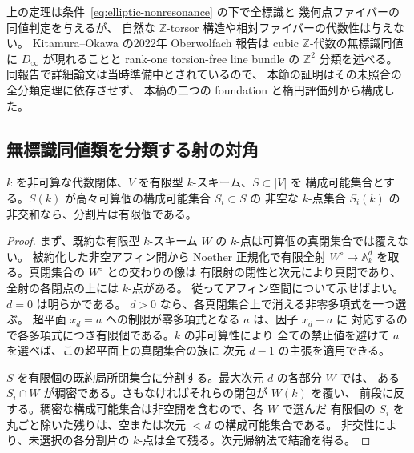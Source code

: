 \begin{remark}[既存研究と残る問題]
上の定理は条件~\eqref{eq:elliptic-nonresonance} の下で全標識と
幾何点ファイバーの同値判定を与えるが、
自然な $\mathbb Z$-torsor 構造や相対ファイバーの代数性は与えない。
Kitamura--Okawa の2022年 Oberwolfach 報告\cite{OkawaKitamura2022OWR}は
cubic $\mathbb Z$-代数の無標識同値に $D_\infty$ が現れることと
rank-one torsion-free line bundle の $\mathbb Z^2$ 分類を述べる。
同報告で詳細論文は当時準備中とされているので、
本節の証明はその未照合の全分類定理に依存させず、
本稿の二つの foundation と楕円評価列から構成した。
\end{remark}

\subsection{無標識同値類を分類する射の対角}
\label{subsec:unmarked-diagonal}

\begin{lemma}[構成可能集合の可算分割]\label{lem:constructible-countable-partition}
$k$ を非可算な代数閉体、$V$ を有限型 $k$-スキーム、$S\subset |V|$ を
構成可能集合とする。$S(k)$ が高々可算個の構成可能集合 $S_i\subset S$ の
非空な $k$-点集合 $S_i(k)$ の非交和なら、分割片は有限個である。
\end{lemma}
\begin{proof}
まず、既約な有限型 $k$-スキーム $W$ の $k$-点は可算個の真閉集合では覆えない。
被約化した非空アフィン開から Noether 正規化で有限全射
$W^\circ\to\mathbb A^d_k$ を取る。真閉集合の $W^\circ$ との交わりの像は
有限射の閉性と次元により真閉であり、全射の各閉点の上には $k$-点がある。
従ってアフィン空間について示せばよい。$d=0$ は明らかである。
$d>0$ なら、各真閉集合上で消える非零多項式を一つ選ぶ。
超平面 $x_d=a$ への制限が零多項式となる $a$ は、因子 $x_d-a$ に
対応するので各多項式につき有限個である。$k$ の非可算性により
全ての禁止値を避けて $a$ を選べば、この超平面上の真閉集合の族に
次元 $d-1$ の主張を適用できる。

$S$ を有限個の既約局所閉集合に分割する。最大次元 $d$ の各部分 $W$ では、
ある $S_i\cap W$ が稠密である。さもなければそれらの閉包が $W(k)$ を覆い、
前段に反する。稠密な構成可能集合は非空開を含むので、各 $W$ で選んだ
有限個の $S_i$ を丸ごと除いた残りは、空または次元 $<d$ の構成可能集合である。
非交性により、未選択の各分割片の $k$-点は全て残る。次元帰納法で結論を得る。
\end{proof}

